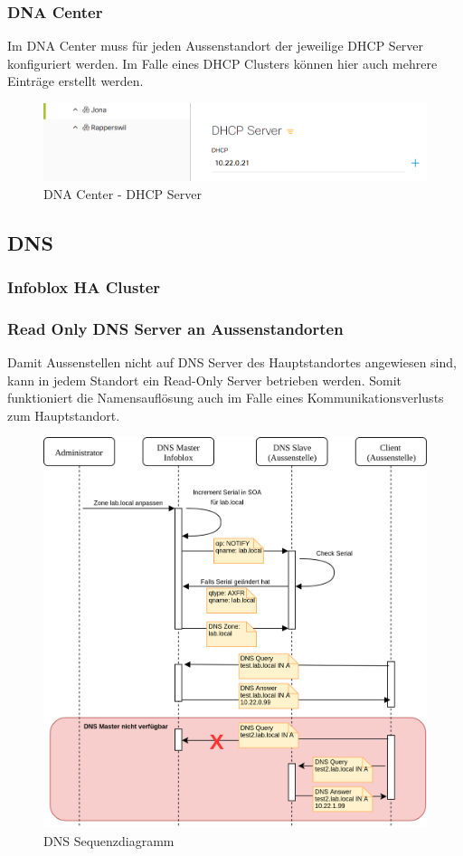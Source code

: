 \subsubsection{DNA Center}
Im DNA Center muss für jeden Aussenstandort der jeweilige DHCP Server konfiguriert werden. Im Falle eines DHCP Clusters können hier auch mehrere Einträge erstellt werden.

\begin{figure}[H]
	\centering
	\includegraphics[width=0.8\linewidth]{img/Absicherung/DNA_Center_DHCP-Server.png}
	\caption{DNA Center - DHCP Server }
	\label{fig:DNA Center - DHCP Server}
\end{figure}

\subsection{DNS}

\subsubsection{Infoblox HA Cluster}


\subsubsection{Read Only DNS Server an Aussenstandorten}
	
Damit Aussenstellen nicht auf DNS Server des Hauptstandortes angewiesen sind, kann in jedem Standort ein Read-Only Server betrieben werden. Somit funktioniert die Namensauflösung auch im Falle eines Kommunikationsverlusts zum Hauptstandort. 

\begin{figure}[H]
	\centering
	\includegraphics[width=0.8\linewidth]{img/Absicherung/DNS_Sequenzdiagram.png}
	\caption{DNS Sequenzdiagramm}
	\label{fig:DNS Sequenzdiagramm}
\end{figure}
